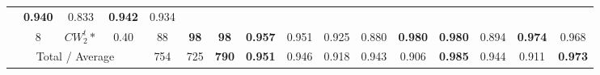 \begin{table}[tph]
\begin{adjustbox}{angle=90}
{\begin{tabular}{c|c|cc|ccc|ccc|ccc|ccc}
                                                                        &
                \textbf{0.940}
                                                                        & 0.833
                                                                        &
                \textbf{0.942}
                                                                        & 0.934
                \\
                                                                        & 8
                                                                        & $CW_{2}^{t}*$                  & 0.40 & 88 &
                \textbf{98}
                                                                        &
                \textbf{98}
                                                                        &
                \textbf{0.957}
                                                                        & 0.951
                                                                        & 0.925                          &
                0.880                                                   &
                \textbf{0.980}
                                                                        &
                \textbf{0.980}
                                                                        & 0.894
                                                                        &
                \textbf{0.974}
                                                                        & 0.968
                \\
                \hline
                \multicolumn{4}{c|}{Total / Average}                    & 754
                                                                        & 725                            &
                \textbf{790}
                                                                        &
                \textbf{0.951}
                                                                        & 0.946
                                                                        & 0.918
                                                                        & 0.943
                                                                        & 0.906
                                                                        &
                \textbf{0.985}
                                                                        & 0.944
                                                                        & 0.911
                                                                        &
                \textbf{0.973}

\end{tabular}}
\end{adjustbox}
\end{table}
